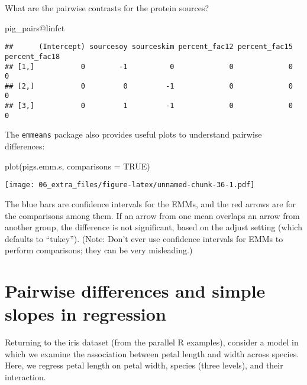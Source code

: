\documentclass[
]{book}
\newenvironment{Shaded}{\begin{snugshade}}{\end{snugshade}}
\newcommand{\AttributeTok}[1]{\textcolor[rgb]{0.77,0.63,0.00}{#1}}
\newcommand{\ConstantTok}[1]{\textcolor[rgb]{0.00,0.00,0.00}{#1}}
\newcommand{\FunctionTok}[1]{\textcolor[rgb]{0.00,0.00,0.00}{#1}}
\newcommand{\NormalTok}[1]{#1}
\newcommand{\SpecialCharTok}[1]{\textcolor[rgb]{0.00,0.00,0.00}{#1}}
\begin{document}
What are the pairwise contrasts for the protein sources?

\begin{Shaded}
\begin{Highlighting}[]
\NormalTok{pig\_pairs}\SpecialCharTok{@}\NormalTok{linfct}
\end{Highlighting}
\end{Shaded}

\begin{verbatim}
##      (Intercept) sourcesoy sourceskim percent_fac12 percent_fac15 percent_fac18
## [1,]           0        -1          0             0             0             0
## [2,]           0         0         -1             0             0             0
## [3,]           0         1         -1             0             0             0
\end{verbatim}

The \texttt{emmeans} package also provides useful plots to understand pairwise differences:

\begin{Shaded}
\begin{Highlighting}[]
\FunctionTok{plot}\NormalTok{(pigs.emm.s, }\AttributeTok{comparisons =} \ConstantTok{TRUE}\NormalTok{)}
\end{Highlighting}
\end{Shaded}

\texttt{[image: 06\_extra\_files/figure-latex/unnamed-chunk-36-1.pdf]}

The blue bars are confidence intervals for the EMMs, and the red arrows are for the comparisons among them. If an arrow from one mean overlaps an arrow from another group, the difference is not significant, based on the adjust setting (which defaults to ``tukey''). (Note: Don't ever use confidence intervals for EMMs to perform comparisons; they can be very misleading.)

\hypertarget{pairwise-differences-and-simple-slopes-in-regression}{%
\section{Pairwise differences and simple slopes in regression}\label{pairwise-differences-and-simple-slopes-in-regression}}

Returning to the iris dataset (from the parallel R examples), consider a model in which we examine the association between petal length and width across species. Here, we regress petal length on petal width, species (three levels), and their interaction.
\end{document}
